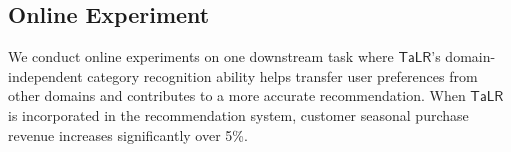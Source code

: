 \subsection{Online Experiment}
We conduct online experiments on one downstream task where $\mathsf{TaLR}$'s domain-independent category recognition ability helps transfer user preferences from other domains and contributes to a more accurate recommendation. When $\mathsf{TaLR}$ is incorporated in the recommendation system, customer seasonal purchase revenue increases significantly over 5\%.